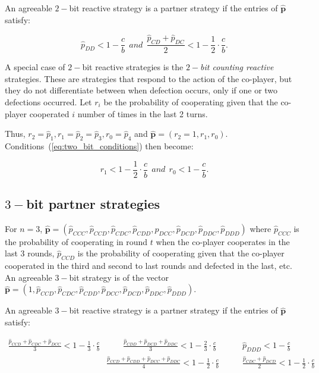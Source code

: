 \documentclass{article}
\theoremstyle{definition}
\begin{document}
An agreeable $2-$bit reactive strategy is a partner strategy if the entries of
$\mathbf{\hat{p}}$ satisfy:

\begin{equation}\label{eq:two_bit_conditions}
  \displaystyle \hat{p}_{DD} < 1\!-\! \frac{c}{b}  ~~and~~ \displaystyle \frac{\hat{p}_{CD} + \hat{p}_{DC}}{2} < 1- \frac{1}{2} \cdot \frac{c}{b}.
\end{equation}

A special case of $2-$bit reactive strategies is the {\it $2-$bit counting
reactive} strategies. These are strategies that respond to the action of the
co-player, but they do not differentiate between when defection occurs, only if
one or two defections occurred. Let \(r_i\) be the probability of cooperating
given that the co-player cooperated \(i\) number of times in the last 2 turns.

Thus, $r_2 = \hat{p}_1, r_1 = \hat{p}_2 =  \hat{p}_3, r_0 = \hat{p}_4$ and
$\mathbf{\hat{p}}=(r_2=1, r_1, r_0)$. Conditions~(\ref{eq:two_bit_conditions})
then become:

\begin{equation}\label{eq:counting_two_bit_conditions}
  \displaystyle r_1 < 1-\frac{1}{2} \cdot \frac{c}{b} ~~and~~ r_0 < 1\!-\! \frac{c}{b}.
\end{equation}

\subsection{$3-$bit partner strategies}

For $n=3$, $\mathbf{\hat{p}}=(\hat{p}_{CCC}, \hat{p}_{CCD}, \hat{p}_{CDC},
\hat{p}_{CDD}, \hat{p}_{DCC}, \hat{p}_{DCD}, \hat{p}_{DDC}, \hat{p}_{DDD})$
where $\hat{p}_{CCC}$ is the probability of cooperating in round $t$ when the
co-player cooperates in the last 3 rounds, $\hat{p}_{CCD}$ is the probability of
cooperating given that the co-player cooperated in the third and second to last
rounds and defected in the last, etc. An agreeable $3-$bit strategy is of the
vector $\mathbf{\hat{p}}=(1, \hat{p}_{CCD}, \hat{p}_{CDC}, \hat{p}_{CDD},
\hat{p}_{DCC}, \hat{p}_{DCD}, \hat{p}_{DDC}, \hat{p}_{DDD})$.

An agreeable $3-$bit reactive strategy is a partner strategy if the entries of
$\mathbf{\hat{p}}$ satisfy:

\begin{align}\label{eq:three_bit_conditions}
  \frac{\hat{p}_{CCD} + \hat{p}_{CDC} + \hat{p}_{DCC}}{3} < 1\!-\! \frac{1}{3} \cdot \frac{c}{b} & \qquad 
  \frac{\hat{p}_{CDD} + \hat{p}_{DCD} + \hat{p}_{DDC}}{3} < 1\!-\! \frac{2}{3} \cdot \frac{c}{b} & \qquad 
  \hat{p}_{DDD} < 1\!-\! \frac{c}{b} \\
  & \frac{\hat{p}_{CCD} + \hat{p}_{CDD} + \hat{p}_{DCC} + \hat{p}_{DDC}}{4}  < 1\!-\! \frac{1}{2} \cdot \frac{c}{b} 
  & \qquad \frac{\hat{p}_{CDC} + \hat{p}_{DCD}}{2} < 1\!-\! \frac{1}{2} \cdot \frac{c}{b}
\end{align}
\end{document}
